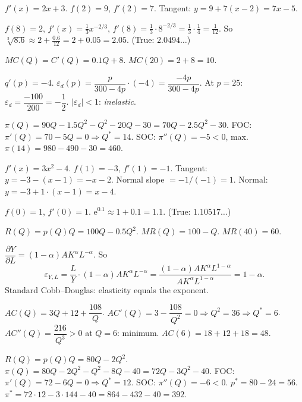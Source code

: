 \begin{solutions}
  \item $f'(x)=2x+3$. $f(2)=9$, $f'(2)=7$. Tangent: $y=9+7(x-2)=7x-5$.

  \item $f(8)=2$, $f'(x)=\tfrac{1}{3}x^{-2/3}$,
        $f'(8)=\tfrac{1}{3}\cdot 8^{-2/3}=\tfrac{1}{3}\cdot\tfrac{1}{4}
        =\tfrac{1}{12}$. So
        $\sqrt[3]{8.6}\approx 2+\tfrac{0.6}{12}=2+0.05=2.05$. (True:
        $2.0494\ldots$)

  \item $MC(Q)=C'(Q)=0.1Q+8$. $MC(20)=2+8=10$.

  \item $q'(p)=-4$.
        $\varepsilon_d(p)=\dfrac{p}{300-4p}\cdot(-4)=\dfrac{-4p}{300-4p}$.
        At $p=25$: $\varepsilon_d=\dfrac{-100}{200}=-\dfrac{1}{2}$.
        $|\varepsilon_d|<1$: \emph{inelastic}.

  \item $\pi(Q)=90Q-1.5Q^2-Q^2-20Q-30=70Q-2.5Q^2-30$. FOC:
        $\pi'(Q)=70-5Q=0\Rightarrow Q^*=14$. SOC: $\pi''(Q)=-5<0$, max.
        $\pi(14)=980-490-30=460$.

  \item $f'(x)=3x^2-4$. $f(1)=-3$, $f'(1)=-1$. Tangent:
        $y=-3-(x-1)=-x-2$. Normal slope $=-1/(-1)=1$. Normal:
        $y=-3+1\cdot(x-1)=x-4$.

  \item $f(0)=1$, $f'(0)=1$. $\mathrm{e}^{0.1}\approx 1+0.1=1.1$. (True:
        $1.10517\ldots$)

  \item $R(Q)=p(Q)Q=100Q-0.5Q^2$. $MR(Q)=100-Q$. $MR(40)=60$.

  \item $\dfrac{\partial Y}{\partial L}=(1-\alpha)AK^{\alpha}L^{-\alpha}$.
        So
        \[
          \varepsilon_{Y,L}=\frac{L}{Y}\cdot(1-\alpha)AK^{\alpha}L^{-\alpha}
            =\frac{(1-\alpha)AK^{\alpha}L^{1-\alpha}}{AK^{\alpha}L^{1-\alpha}}
            =1-\alpha .
        \]
        Standard Cobb--Douglas: elasticity equals the exponent.

  \item $AC(Q)=3Q+12+\dfrac{108}{Q}$.
        $AC'(Q)=3-\dfrac{108}{Q^2}=0\Rightarrow Q^2=36\Rightarrow Q^*=6$.
        $AC''(Q)=\dfrac{216}{Q^3}>0$ at $Q=6$: minimum.
        $AC(6)=18+12+18=48$.

  \item $R(Q)=p(Q)Q=80Q-2Q^2$.
        $\pi(Q)=80Q-2Q^2-Q^2-8Q-40=72Q-3Q^2-40$. FOC:
        $\pi'(Q)=72-6Q=0\Rightarrow Q^*=12$. SOC: $\pi''(Q)=-6<0$.
        $p^*=80-24=56$. $\pi^*=72\cdot12-3\cdot144-40=864-432-40=392$.


\end{solutions}
